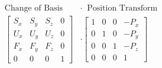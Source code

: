 \documentclass[preview]{standalone}
\begin{document}
\begin{align*}
  \text{Change of Basis} \; \; & \cdot \; \; \text{Position Transform} \\
  \begin{bmatrix}
    S_x & S_y & S_z & 0 \\
    U_x & U_y & U_z & 0 \\
    F_x & F_y & F_z & 0 \\
    0 & 0 & 0 & 1 
  \end{bmatrix} & \cdot
  \begin{bmatrix}
    1 & 0 & 0 & -P_x \\
    0 & 1 & 0 & -P_y \\
    0 & 0 & 1 & -P_z \\
    0 & 0 & 0 & 1 
  \end{bmatrix}
\end{align*}
\end{document}
